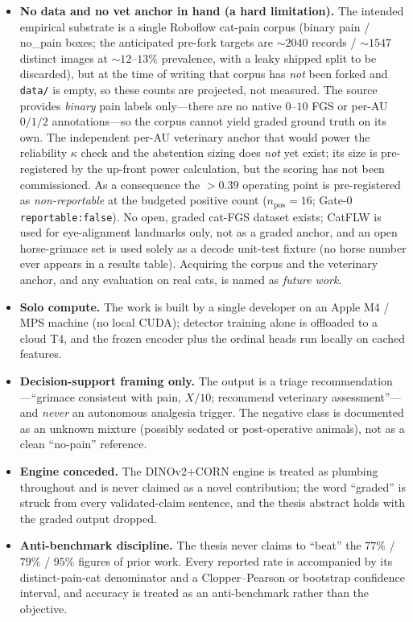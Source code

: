 \begin{itemize}
  \item \textbf{No data and no vet anchor in hand (a hard limitation).} The
    intended empirical substrate is a single Roboflow cat-pain corpus (binary
    pain / no\_pain boxes; the anticipated pre-fork targets are
    $\sim 2040$ records / $\sim 1547$ distinct images at $\sim 12$--$13\%$
    prevalence, with a leaky shipped split to be discarded), but at the time of
    writing that corpus has \emph{not} been forked and \texttt{data/} is empty,
    so these counts are projected, not measured. The source provides
    \emph{binary} pain labels only---there are no native $0$--$10$ FGS or per-AU
    $0/1/2$ annotations---so the corpus cannot yield graded ground truth on its
    own. The independent per-AU veterinary anchor that would power the
    reliability $\kappa$ check and the abstention sizing does \emph{not} yet
    exist; its size is pre-registered by the up-front power calculation, but the
    scoring has not been commissioned. As a consequence the $>0.39$ operating
    point is pre-registered as \emph{non-reportable} at the budgeted positive
    count ($n_{\text{pos}}{=}16$; Gate-0 \texttt{reportable:false}). No open,
    graded cat-FGS dataset exists; CatFLW \autocite{martvel2024catflw} is used
    for eye-alignment landmarks only, not as a graded anchor, and an open
    horse-grimace set is used solely as a decode unit-test fixture (no horse
    number ever appears in a results table). Acquiring the corpus and the
    veterinary anchor, and any evaluation on real cats, is named as
    \emph{future work}.
  \item \textbf{Solo compute.} The work is built by a single developer on an Apple
    M4 / MPS machine (no local CUDA); detector training alone is offloaded to a
    cloud T4, and the frozen encoder plus the ordinal heads run locally on cached
    features.
  \item \textbf{Decision-support framing only.} The output is a triage
    recommendation---``grimace consistent with pain, $X/10$; recommend veterinary
    assessment''---and \emph{never} an autonomous analgesia trigger. The negative
    class is documented as an unknown mixture (possibly sedated or post-operative
    animals), not as a clean ``no-pain'' reference.
  \item \textbf{Engine conceded.} The DINOv2$+$CORN engine is treated as plumbing
    throughout and is never claimed as a novel contribution; the word
    ``graded'' is struck from every validated-claim sentence, and the thesis
    abstract holds with the graded output dropped.
  \item \textbf{Anti-benchmark discipline.} The thesis never claims to ``beat''
    the $77\%$ / $79\%$ / $95\%$ figures of prior work. Every reported rate is
    accompanied by its distinct-pain-cat denominator and a Clopper--Pearson or
    bootstrap confidence interval, and accuracy is treated as an anti-benchmark
    rather than the objective.
\end{itemize}

